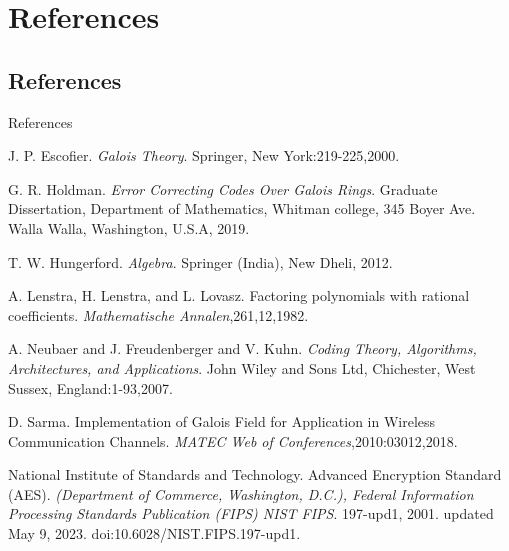 \documentclass{beamer}
\begin{document}
\section{References}
\subsection{References}
\begin{frame}{References}
  \footnotesize

  \begin{thebibliography}{9}

    J. P. Escofier. \emph{Galois Theory}. Springer, New York:219-225,2000.

    G. R. Holdman. \emph{Error Correcting Codes  Over Galois Rings}. Graduate Dissertation, Department of Mathematics, Whitman college, 345 Boyer Ave.
    Walla Walla, Washington, U.S.A, 2019.

    T. W. Hungerford. \emph{Algebra}. Springer (India), New Dheli, 2012.

    A. Lenstra, H. Lenstra, and L. Lovasz. Factoring polynomials with rational coefficients. \emph{Mathematische Annalen},261,12,1982.

    A. Neubaer and J. Freudenberger and V. Kuhn. \emph{Coding Theory, Algorithms, Architectures, and Applications}. John Wiley and Sons Ltd, Chichester, West Sussex, England:1-93,2007.

    D. Sarma. Implementation of Galois Field for Application in Wireless Communication Channels. \emph{MATEC Web of Conferences},2010:03012,2018.

    National Institute of Standards and Technology. Advanced Encryption
    Standard (AES). \emph{(Department of Commerce, Washington, D.C.), Federal Information Processing Standards Publication (FIPS) NIST FIPS}. 197-upd1, 2001. updated May 9, 2023. doi:10.6028/NIST.FIPS.197-upd1.
  \end{thebibliography}
\end{frame}
\end{document}
